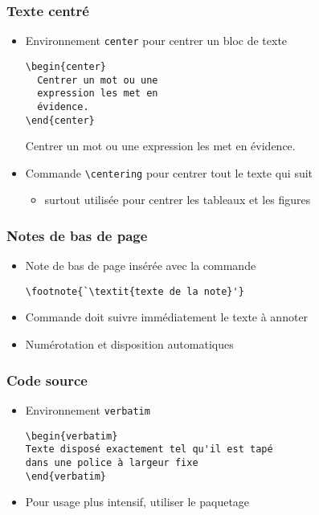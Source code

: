 \begin{frame}[fragile=singleslide]
  \frametitle{Texte centré}

  \begin{itemize}
  \item Environnement \texttt{center} pour centrer un bloc de texte
    \begin{demo}
      \begin{eqxample}
\begin{lstlisting}
\begin{center}
  Centrer un mot ou une
  expression les met en
  évidence.
\end{center}
\end{lstlisting}
        \producing
        \begin{center}
          Centrer un mot ou une expression
          les met en évidence.
        \end{center}
      \end{eqxample}
    \end{demo}
  \item Commande \verb=\centering= pour centrer tout le texte qui suit
    \begin{itemize}
    \item surtout utilisée pour centrer les tableaux et les figures
    \end{itemize}
  \end{itemize}
\end{frame}

\begin{frame}[fragile]
  \frametitle{Notes de bas de page}
  \begin{itemize}
  \item Note de bas de page insérée avec la commande
\begin{lstlisting}
\footnote{`\textit{texte de la note}'}
\end{lstlisting}
  \item Commande doit suivre immédiatement le texte à annoter
  \item Numérotation et disposition automatiques
  \end{itemize}
\end{frame}

\begin{frame}[fragile=singleslide]
  \frametitle{Code source}
  \begin{itemize}
  \item Environnement \texttt{verbatim}
\begin{lstlisting}
\begin{verbatim}
Texte disposé exactement tel qu'il est tapé
dans une police à largeur fixe
\end{verbatim}
\end{lstlisting}
  \item Pour usage plus intensif, utiliser le paquetage 
  \end{itemize}
\end{frame}

